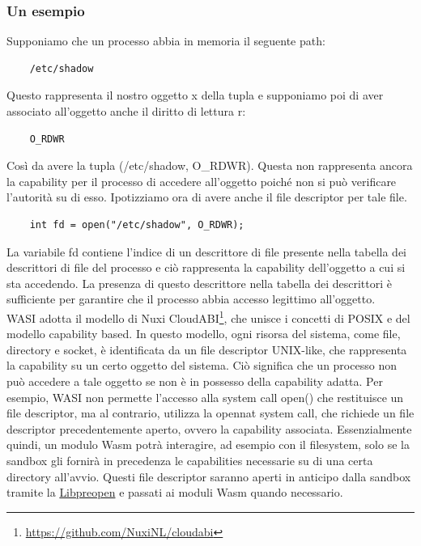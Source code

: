 \subsubsection{Un esempio}
\label{sec:capability-example}
Supponiamo che un processo abbia in memoria il seguente path:
\begin{lstlisting}
    /etc/shadow
\end{lstlisting}
Questo rappresenta il nostro oggetto x della tupla e supponiamo poi di aver associato all'oggetto anche il diritto di
lettura r: 
\begin{lstlisting}
    O_RDWR
\end{lstlisting}
Così da avere la tupla (/etc/shadow, O\_RDWR). Questa non rappresenta ancora la capability per il processo di accedere
all'oggetto poiché non si può verificare l'autorità su di esso. Ipotizziamo ora di avere anche il file descriptor per
tale file.
\begin{lstlisting}
    int fd = open("/etc/shadow", O_RDWR);
\end{lstlisting}
La variabile fd contiene l'indice di un descrittore di file presente nella tabella dei descrittori di file del processo
e ciò rappresenta la capability dell'oggetto a cui si sta accedendo. La presenza di questo descrittore nella tabella dei
descrittori è sufficiente per garantire che il processo abbia accesso legittimo all'oggetto. \\

WASI adotta il modello di Nuxi CloudABI\footnote{\url{https://github.com/NuxiNL/cloudabi}}, che unisce i concetti di
POSIX e del modello capability based. In questo modello, ogni risorsa del sistema, come file, directory e socket, è
identificata da un file descriptor UNIX-like, che rappresenta la capability su un certo oggetto del sistema. Ciò
significa che un processo non può accedere a tale oggetto se non è in possesso della capability adatta. Per esempio,
WASI non permette l'accesso alla system call open() che restituisce un file descriptor, ma al contrario, utilizza la
opennat system call, che richiede un file descriptor precedentemente aperto, ovvero la capability associata.
Essenzialmente quindi, un modulo Wasm potrà interagire, ad esempio con il filesystem, solo se la sandbox gli fornirà in
precedenza le capabilities necessarie su di una certa directory all'avvio. Questi file descriptor saranno aperti in
anticipo dalla sandbox tramite la \hyperref[sec:libpreopen]{Libpreopen} e passati ai moduli Wasm quando necessario.
